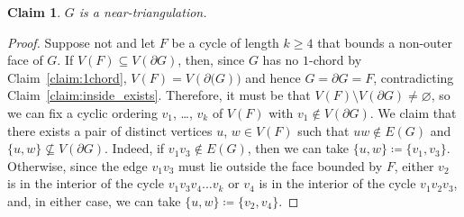 \documentclass[11pt]{article}
\theoremstyle{slantthm}
\newtheorem{claim}{Claim}%
\numberwithin{equation}{section}
\theoremstyle{definition}
\renewcommand{\leq}{\leqslant}
\renewcommand{\geq}{\geqslant}
\newcommand{\defeq}{\coloneqq}
\numberwithin{equation}{section}
\newcommand{\0}{\varnothing}
\newcommand{\set}[1]{\{#1\}}
\newcommand{\bdry}[1]{{\partial #1}}
\newcommand\eve[1]{{\color{nicelavender}{#1}}}
\begin{document}
    \begin{claim}\label{claim:near-triangulation}
        $G$ is a near-triangulation.
    \end{claim}
    \begin{proof}
        Suppose not and let $F$ be a cycle of length $k \geq 4$ that bounds a non-outer face of $G$. If $V(F) \subseteq V(\bdry{G})$, then, since $G$ has no $1$-chord by Claim~\ref{claim:1chord}, $V(F) = V(\bdry(G))$ and hence $G = \bdry{G} = F$, contradicting Claim~\ref{claim:inside_exists}. %
        Therefore, it must be that $V(F) \setminus V(\bdry{G}) \neq \0$, so we can
        fix a cyclic ordering $v_1$, \ldots, $v_k$ of $V(F)$ with $v_1 \notin V(\bdry{G})$. We claim that there exists a pair of distinct vertices $u$, $w \in V(F)$ such that $uw \notin E(G)$ and %
        $\set{u,w} \not\subseteq V(\bdry{G})$. Indeed, if $v_1v_3 \notin E(G)$, then we can take $\set{u,w} \defeq \set{v_1, v_3}$. Otherwise, since the edge $v_1v_3$ must lie outside the face bounded by $F$, either $v_2$ is in the interior of the cycle $v_1 v_3 v_4 \ldots v_k$ or $v_4$ is in the interior of the cycle $v_1 v_2 v_3$, and, in either case, we can take $\set{u,w} \defeq \set{v_2, v_4}$. 

\end{proof}
\end{document}
